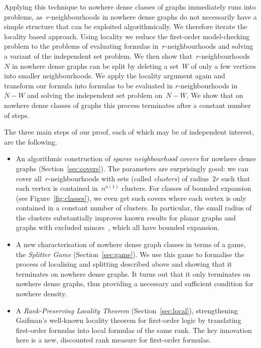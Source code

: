 \documentclass[11pt]{article}
\numberwithin{equation}{section}
\begin{document}
Applying this technique to nowhere dense classes of graphs immediately
runs into problems, as~$r$-neighbourhoods in nowhere dense graphs do
not necessarily have a simple structure that can be exploited algorithmically. We therefore
iterate the locality based approach. Using locality we reduce the
first-order model-checking problem to the problems of evaluating
formulas in~$r$-neighbourhoods and solving a variant of the
independent set problem. We then show that~$r$-neighbourhoods~$N$ in
nowhere dense graphs can be split by deleting a set~$W$ of only a few
vertices into smaller neighbourhoods. We apply the locality
argument again and transform our formula into formulas to be evaluated
in $r$-neighbourhoods in~$N-W$ and solving the independent set
problem on~$N-W$. We show that on nowhere dense classes of graphs
this process terminates after a constant number of steps.

The three main steps of our proof, each of which may be of independent
interest, are the following.%
\begin{itemize}%
\item An algorithmic construction of \emph{sparse neighbourhood
    covers} for nowhere dense graphs (Section~\ref{sec:covers}). The
  parameters are surprisingly good: we can cover
  all~$r$-neighbourhoods with sets (called \emph{clusters}) of
  radius~$2r$ such that each vertex is contained in~$n^{o(1)}$
  clusters. For classes of bounded expansion (see
  Figure~\ref{fig:classes}), we even get such covers where each vertex
  is only contained in a constant number of clusters.  In particular,
  the small radius of the clusters substantially improves known
  results for planar graphs and graphs with excluded
  minors~\cite{abrgavmal+07,buscoslaf+07}, which all have bounded
  expansion.
\item A new characterisation of nowhere dense graph classes in terms
  of a game, the \emph{Splitter Game} (Section~\ref{sec:game}). We use
  this game to formalise the process of localising and splitting
  described above and showing that it terminates on nowhere dense
  graphs. It turns out that it only terminates on nowhere dense
  graphs, thus providing a necessary and sufficient condition for
  nowhere density.
\item A \emph{Rank-Preserving Locality Theorem}
  (Section~\ref{sec:local}), strengthening Gaifman's well-known
  locality theorem for first-order logic by translating first-order
  formulas into local formulas of the same rank. The key innovation
  here is a new, discounted rank measure for first-order formulas.
\end{itemize}
\end{document}
